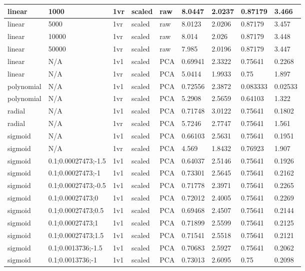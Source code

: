 \begin{longtable}{lllllllll}
linear & 1000 & 1vr & scaled & raw & 8.0447 & 2.0237 & 0.87179 & 3.466\\ \hline
linear & 5000 & 1vr & scaled & raw & 8.0123 & 2.0206 & 0.87179 & 3.457\\ \hline
linear & 10000 & 1vr & scaled & raw & 8.014 & 2.026 & 0.87179 & 3.448\\ \hline
linear & 50000 & 1vr & scaled & raw & 7.985 & 2.0196 & 0.87179 & 3.447\\ \hline
linear & N/A & 1v1 & scaled & PCA & 0.69941 & 2.3322 & 0.75641 & 0.2268\\ \hline
linear & N/A & 1vr & scaled & PCA & 5.0414 & 1.9933 & 0.75 & 1.897\\ \hline
polynomial & N/A & 1v1 & scaled & PCA & 0.72556 & 2.3872 & 0.083333 & 0.02533\\ \hline
polynomial & N/A & 1vr & scaled & PCA & 5.2908 & 2.5659 & 0.64103 & 1.322\\ \hline
radial & N/A & 1v1 & scaled & PCA & 0.71748 & 3.0122 & 0.75641 & 0.1802\\ \hline
radial & N/A & 1vr & scaled & PCA & 5.7246 & 2.7747 & 0.75641 & 1.561\\ \hline
sigmoid & N/A & 1v1 & scaled & PCA & 0.66103 & 2.5631 & 0.75641 & 0.1951\\ \hline
sigmoid & N/A & 1vr & scaled & PCA & 4.569 & 1.8432 & 0.76923 & 1.907\\ \hline
sigmoid & 0.1;0.00027473;-1.5 & 1v1 & scaled & PCA & 0.64037 & 2.5146 & 0.75641 & 0.1926\\ \hline
sigmoid & 0.1;0.00027473;-1 & 1v1 & scaled & PCA & 0.73301 & 2.5645 & 0.75641 & 0.2162\\ \hline
sigmoid & 0.1;0.00027473;-0.5 & 1v1 & scaled & PCA & 0.71778 & 2.3971 & 0.75641 & 0.2265\\ \hline
sigmoid & 0.1;0.00027473;0 & 1v1 & scaled & PCA & 0.72012 & 2.4005 & 0.75641 & 0.2269\\ \hline
sigmoid & 0.1;0.00027473;0.5 & 1v1 & scaled & PCA & 0.69468 & 2.4507 & 0.75641 & 0.2144\\ \hline
sigmoid & 0.1;0.00027473;1 & 1v1 & scaled & PCA & 0.71899 & 2.5599 & 0.75641 & 0.2125\\ \hline
sigmoid & 0.1;0.00027473;1.5 & 1v1 & scaled & PCA & 0.71541 & 2.5518 & 0.75641 & 0.2121\\ \hline
sigmoid & 0.1;0.0013736;-1.5 & 1v1 & scaled & PCA & 0.70683 & 2.5927 & 0.75641 & 0.2062\\ \hline
sigmoid & 0.1;0.0013736;-1 & 1v1 & scaled & PCA & 0.73013 & 2.6095 & 0.75 & 0.2098\\ \hline

\end{longtable}
